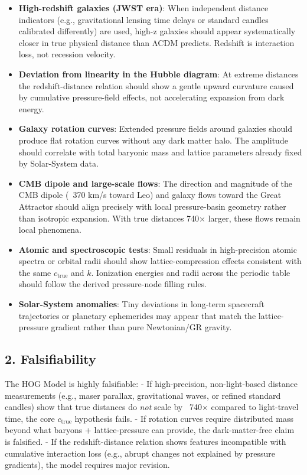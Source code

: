 \documentclass[11pt,a4paper]{book}
\begin{document}
{\begin{itemize}
\item \textbf{High-redshift galaxies (JWST era)}: When independent distance indicators (e.g., gravitational lensing time delays or standard candles calibrated differently) are used, high-z galaxies should appear systematically closer in true physical distance than ΛCDM predicts. Redshift is interaction loss, not recession velocity.

\item \textbf{Deviation from linearity in the Hubble diagram}: At extreme distances the redshift-distance relation should show a gentle upward curvature caused by cumulative pressure-field effects, not accelerating expansion from dark energy.

\item \textbf{Galaxy rotation curves}: Extended pressure fields around galaxies should produce flat rotation curves without any dark matter halo. The amplitude should correlate with total baryonic mass and lattice parameters already fixed by Solar-System data.

\item \textbf{CMB dipole and large-scale flows}: The direction and magnitude of the CMB dipole (~370 km/s toward Leo) and galaxy flows toward the Great Attractor should align precisely with local pressure-basin geometry rather than isotropic expansion. With true distances 740× larger, these flows remain local phenomena.

\item \textbf{Atomic and spectroscopic tests}: Small residuals in high-precision atomic spectra or orbital radii should show lattice-compression effects consistent with the same \( c_{\text{true}} \) and \( k \). Ionization energies and radii across the periodic table should follow the derived pressure-node filling rules.

\item \textbf{Solar-System anomalies}: Tiny deviations in long-term spacecraft trajectories or planetary ephemerides may appear that match the lattice-pressure gradient rather than pure Newtonian/GR gravity.
\end{itemize}

\subsection{2. Falsifiability}

The HOG Model is highly falsifiable:
- If high-precision, non-light-based distance measurements (e.g., maser parallax, gravitational waves, or refined standard candles) show that true distances do \emph{not} scale by ~740× compared to light-travel time, the core \( c_{\text{true}} \) hypothesis fails.
- If rotation curves require distributed mass beyond what baryons + lattice-pressure can provide, the dark-matter-free claim is falsified.
- If the redshift-distance relation shows features incompatible with cumulative interaction loss (e.g., abrupt changes not explained by pressure gradients), the model requires major revision.

}
\end{document}
